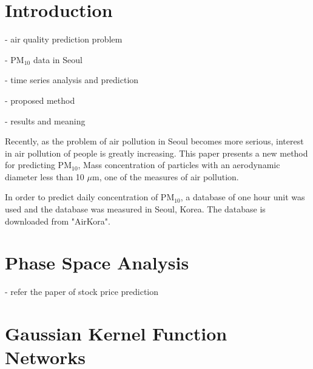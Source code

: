 \documentclass[preprint,12pt]{elsarticle}
\begin{document}






\section{Introduction}

- air quality prediction problem

- PM$_{10}$ data in Seoul

- time series analysis and prediction

- proposed method

- results and meaning

Recently, as the problem of air pollution in Seoul becomes more serious, interest in air pollution of people is greatly increasing. This paper presents a new method for predicting PM$_{10}$, Mass concentration of particles with an aerodynamic diameter less than 10 $\mu$m, one of the measures of air pollution.

In order to predict daily concentration of PM$_{10}$, a database of one hour unit was used and the database was measured in Seoul, Korea. The database is downloaded from "AirKora".


\section{Phase Space Analysis}

- refer the paper of stock price prediction



\section{Gaussian Kernel Function Networks}
\end{document}

